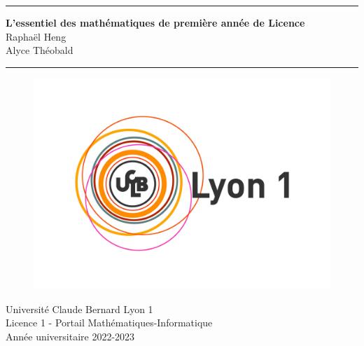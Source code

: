 \begin{titlepage}
	\begin{center}
		\vspace*{\fill}
			\vspace*{1cm}
			\hrule
			\vspace{0.5cm}
			\Large \textbf{L'essentiel des mathématiques de première année de Licence}
			\\
			Raphaël Heng
			\\
            Alyce Théobald
			\vspace{0.5cm}
			\hrule
			\vspace{0.5cm}
			\begin{figure}[!h]
				\centering
				\includegraphics[scale=0.6]{img/logo_lyon1.jpg}
			\end{figure}
			\vspace{0.5cm}
			Université Claude Bernard Lyon 1 
			\\
			Licence 1 - Portail Mathématiques-Informatique 
			\\
			Année universitaire 2022-2023 
			\\
			\vspace*{1cm}
		\vspace*{\fill}
	\end{center}
\end{titlepage}
